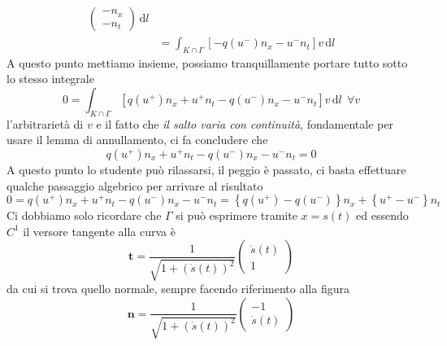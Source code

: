 \documentclass[10pt,a4paper,twoside,openright]{book}
\newcommand{\de}{\,\mathrm d}
\newcommand{\dl}{\de l}
\begin{document}
\begin{dimostrazione}
\begin{align*}
\begin{pmatrix}
            -n_{x} \\
            -n_{t}
        \end{pmatrix} \dl                                                                                                                                                              \\
                                                        & =\int _{K\cap \Gamma }\left[ -q\left(u^{-}\right) n_{x} -u^{-} n_{t}\right] v\dl
    \end{align*}
    A questo punto mettiamo insieme, possiamo tranquillamente portare tutto sotto lo stesso integrale
    \begin{equation*}
        0=\int _{K\cap \Gamma }\left[ q\left(u^{+}\right) n_{x} +u^{+} n_{t} -q\left(u^{-}\right) n_{x} -u^{-} n_{t}\right] v\dl\ \ \forall v
    \end{equation*}
    l'arbitrarietà di $v$ e il fatto che \emph{il salto varia con continuità}, fondamentale per usare il lemma di annullamento, ci fa concludere che
    \begin{equation*}
        q\left(u^{+}\right) n_{x} +u^{+} n_{t} -q\left(u^{-}\right) n_{x} -u^{-} n_{t} =0
    \end{equation*}
    A questo punto lo studente può rilassarsi, il peggio è passato, ci basta effettuare qualche passaggio algebrico per arrivare al risultato
    \begin{equation*}
        0=q\left(u^{+}\right) n_{x} +u^{+} n_{t} -q\left(u^{-}\right) n_{x} -u^{-} n_{t} =\left\{q\left(u^{+}\right) -q\left(u^{-}\right)\right\} n_{x} +\left\{u^{+} -u^{-}\right\} n_{t}
    \end{equation*}
    Ci dobbiamo solo ricordare che $\Gamma $ si può esprimere tramite $x=s(t)$ ed essendo $C^{1}$ il versore tangente alla curva è
    \begin{equation*}
        \mathbf{t} =\frac{1}{\sqrt{1+(\dot{s}(t))^{2}}}
        \begin{pmatrix}
            \dot{s}(t) \\
            1
        \end{pmatrix}
    \end{equation*}
    da cui si trova quello normale, sempre facendo riferimento alla figura
    \begin{equation*}
        \mathbf{n} =\frac{1}{\sqrt{1+(\dot{s}(t))^{2}}}
        \begin{pmatrix}
            -1 \\
            \dot{s}(t)
        \end{pmatrix}

\end{equation*}
\end{dimostrazione}
\end{document}
